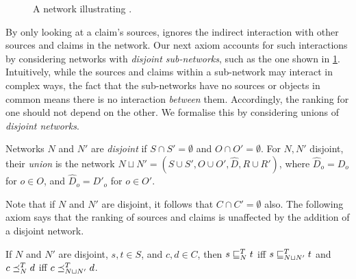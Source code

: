 \begin{figure}
    \centering
    \caption{
        A network illustrating \disjointindependence{}.
    }
    \label{td_new_fig_disjointindep_example}
\end{figure}

By only looking at a claim's sources, \classicalindependence{} ignores the
indirect interaction with other sources and claims in the network. Our next
axiom accounts for such interactions by considering networks with
\emph{disjoint sub-networks}, such as the one shown in
\cref{td_new_fig_disjointindep_example}. Intuitively, while the sources and
claims within a sub-network may interact in complex ways, the fact that the
sub-networks have no sources or objects in common means there is no interaction
\emph{between} them. Accordingly, the ranking for one should not depend on the
other. We formalise this by considering unions of \emph{disjoint
networks}.\footnotemark{}


\begin{definition}
    Networks $N$ and $N'$ are \emph{disjoint} if $S \cap S' = \emptyset$ and $O
    \cap O' = \emptyset$. For $N, N'$ disjoint, their \emph{union} is the
    network $N \sqcup N' = (S \cup S', O \cup O', \hat{D}, R \cup R')$, where
    $\hat{D}_o = D_o$ for $o \in O$, and $\hat{D}_o = D'_o$ for $o \in O'$.
\end{definition}

Note that if $N$ and $N'$ are disjoint, it follows that $C \cap C' = \emptyset$
also.
%
The following axiom says that the ranking of sources and claims is unaffected
by the addition of a disjoint network.

\begin{axiom}[\disjointindependence{}]
    If $N$ and $N'$ are disjoint, $s, t \in S$, and $c, d \in C$, then
    $s \sqsubseteq_N^T t$ iff $s \sqsubseteq_{N \sqcup N'}^T t$ and $c \preceq_N^T d$ iff $c
    \preceq_{N \sqcup N'}^T d$.
\end{axiom}

